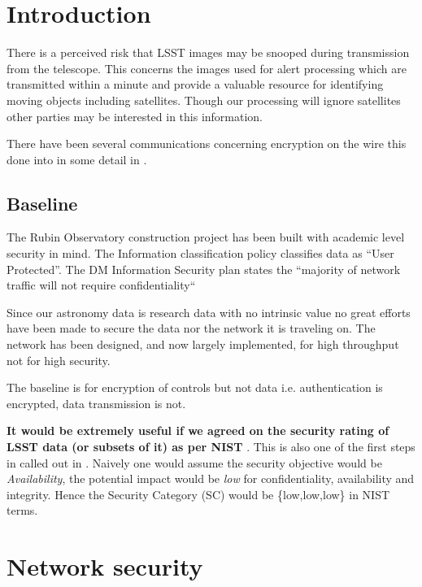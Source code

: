 \section{Introduction} \label{sec:intro}

There is a perceived  risk that LSST  images may be snooped during transmission from the telescope. This concerns the images used for alert processing which are transmitted within a minute and provide a valuable resource for identifying moving objects including satellites. Though our processing will ignore satellites other parties may be interested in this information.

There have been several communications concerning encryption on the wire this done into in some detail in .


\subsection{Baseline }
The Rubin Observatory construction project has been built with academic level security in mind.
The
 Information classification policy  classifies data as  “User Protected”.
The DM Information Security plan  states the “majority of network traffic will not require confidentiality“

Since our astronomy data is research data with no intrinsic value no great efforts have been made to secure the
data nor the network it is traveling on.
The network has been designed, and now largely implemented, for high throughput not for high security.

The baseline is for encryption of controls but not data i.e. authentication is encrypted, data transmission is not.

{\bf It would be extremely useful if we agreed on the security rating of LSST data (or subsets of it)  as per NIST  }. This is also one of the first steps in  called out in .
Naively one would assume the security objective would be \emph{Availability}, the potential impact would be \emph{low} for confidentiality, availability and integrity. Hence  the Security Category (SC) would be \{low,low,low\} in NIST terms.



\section{Network security}\label{sec:net}

